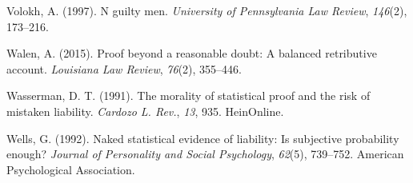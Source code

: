 \documentclass[10pt,dvipsnames,enabledeprecatedfontcommands]{scrartcl}
\begin{document}
\hypertarget{ref-voloch1997}{}
Volokh, A. (1997). N guilty men. \emph{University of Pennsylvania Law
Review}, \emph{146}(2), 173--216.

\hypertarget{ref-walen2015}{}
Walen, A. (2015). Proof beyond a reasonable doubt: A balanced
retributive account. \emph{Louisiana Law Review}, \emph{76}(2),
355--446.

\hypertarget{ref-wasserman1991morality}{}
Wasserman, D. T. (1991). The morality of statistical proof and the risk
of mistaken liability. \emph{Cardozo L. Rev.}, \emph{13}, 935.
HeinOnline.

\hypertarget{ref-wells1992naked}{}
Wells, G. (1992). Naked statistical evidence of liability: Is subjective
probability enough? \emph{Journal of Personality and Social Psychology},
\emph{62}(5), 739--752. American Psychological Association.
\end{document}
